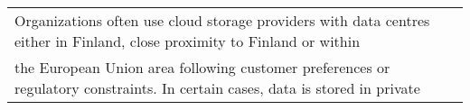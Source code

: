 \begin{table*}[t]
\begin{tabular}{p{}p{}p{}p{}p{2cm}p{1cm}p{}}
       
    \multicolumn{7}{l}{
    Organizations often use cloud storage providers with data centres  either in Finland, close proximity to Finland or within}\\
    
    \multicolumn{7}{l}{the European Union area following customer preferences or regulatory constraints. In certain cases, data is stored in private }\\
    
    \end{tabular}%
  \label{tab:data_source_storage_mlframeworks_interviewees}%
\end{table*}%